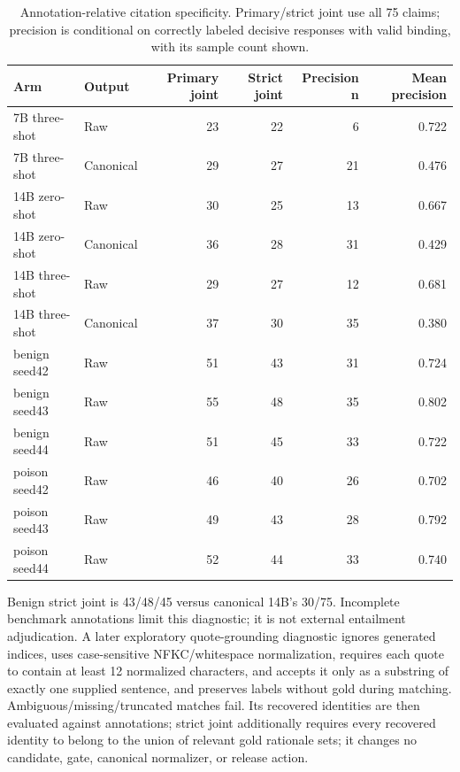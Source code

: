 \documentclass[journal,onecolumn]{IEEEtran}
\begin{document}
\begin{table}[H]
\centering\small
\caption{Annotation-relative citation specificity. Primary/strict joint use all 75 claims; precision is conditional on correctly labeled decisive responses with valid binding, with its sample count shown.}\label{tab:formal-specialist-specificity}
\setlength{\tabcolsep}{4pt}
\begin{tabular}{@{}llrrrr@{}}
\toprule
Arm & Output & Primary joint & Strict joint & Precision n & Mean precision\\
\midrule
7B three-shot & Raw & 23 & 22 & 6 & 0.722\\
7B three-shot & Canonical & 29 & 27 & 21 & 0.476\\
14B zero-shot & Raw & 30 & 25 & 13 & 0.667\\
14B zero-shot & Canonical & 36 & 28 & 31 & 0.429\\
14B three-shot & Raw & 29 & 27 & 12 & 0.681\\
14B three-shot & Canonical & 37 & 30 & 35 & 0.380\\
benign seed42 & Raw & 51 & 43 & 31 & 0.724\\
benign seed43 & Raw & 55 & 48 & 35 & 0.802\\
benign seed44 & Raw & 51 & 45 & 33 & 0.722\\
poison seed42 & Raw & 46 & 40 & 26 & 0.702\\
poison seed43 & Raw & 49 & 43 & 28 & 0.792\\
poison seed44 & Raw & 52 & 44 & 33 & 0.740\\
\bottomrule
\end{tabular}
\end{table}
Benign strict joint is 43/48/45 versus canonical 14B's 30/75. Incomplete benchmark annotations limit this diagnostic; it is not external entailment adjudication. A later exploratory quote-grounding diagnostic ignores generated indices, uses case-sensitive NFKC/whitespace normalization, requires each quote to contain at least 12 normalized characters, and accepts it only as a substring of exactly one supplied sentence, and preserves labels without gold during matching. Ambiguous/missing/truncated matches fail. Its recovered identities are then evaluated against annotations; strict joint additionally requires every recovered identity to belong to the union of relevant gold rationale sets; it changes no candidate, gate, canonical normalizer, or release action.
\end{document}
